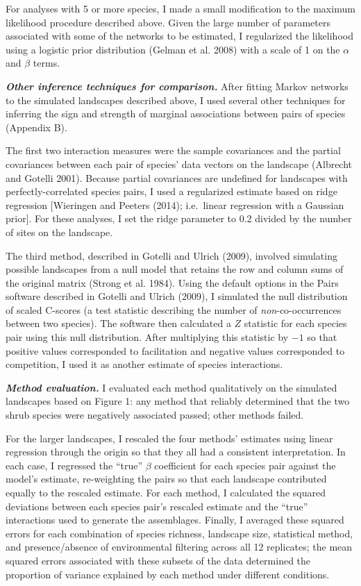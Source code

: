 \documentclass[12pt,]{article}
\begin{document}
\begin{spacing}{1.9}
\begin{flushleft}
For analyses with 5 or more species, I made a small modification to the
maximum likelihood procedure described above. Given the large number of
parameters associated with some of the networks to be estimated, I
regularized the likelihood using a logistic prior distribution (Gelman
et al. 2008) with a scale of 1 on the \(\alpha\) and \(\beta\) terms.

\textbf{\emph{Other inference techniques for comparison.}} After fitting
Markov networks to the simulated landscapes described above, I used
several other techniques for inferring the sign and strength of marginal
associations between pairs of species (Appendix B).

The first two interaction measures were the sample covariances and the
partial covariances between each pair of species' data vectors on the
landscape (Albrecht and Gotelli 2001). Because partial covariances are
undefined for landscapes with perfectly-correlated species pairs, I used
a regularized estimate based on ridge regression {[}Wieringen and
Peeters (2014); i.e.~linear regression with a Gaussian prior{]}. For
these analyses, I set the ridge parameter to 0.2 divided by the number
of sites on the landscape.

The third method, described in Gotelli and Ulrich (2009), involved
simulating possible landscapes from a null model that retains the row
and column sums of the original matrix (Strong et al. 1984). Using the
default options in the Pairs software described in Gotelli and Ulrich
(2009), I simulated the null distribution of scaled C-scores (a test
statistic describing the number of \emph{non}-co-occurrences between two
species). The software then calculated a \(Z\) statistic for each
species pair using this null distribution. After multiplying this
statistic by \(-1\) so that positive values corresponded to facilitation
and negative values corresponded to competition, I used it as another
estimate of species interactions.

\textbf{\emph{Method evaluation.}} I evaluated each method qualitatively
on the simulated landscapes based on Figure 1: any method that reliably
determined that the two shrub species were negatively associated passed;
other methods failed.

For the larger landscapes, I rescaled the four methods' estimates using
linear regression through the origin so that they all had a consistent
interpretation. In each case, I regressed the ``true'' \(\beta\)
coefficient for each species pair against the model's estimate,
re-weighting the pairs so that each landscape contributed equally to the
rescaled estimate. For each method, I calculated the squared deviations
between each species pair's rescaled estimate and the ``true''
interactions used to generate the assemblages. Finally, I averaged these
squared errors for each combination of species richness, landscape size,
statistical method, and presence/absence of environmental filtering
across all 12 replicates; the mean squared errors associated with these
subsets of the data determined the proportion of variance explained by
each method under different conditions.


\end{flushleft}
\end{spacing}
\end{document}
